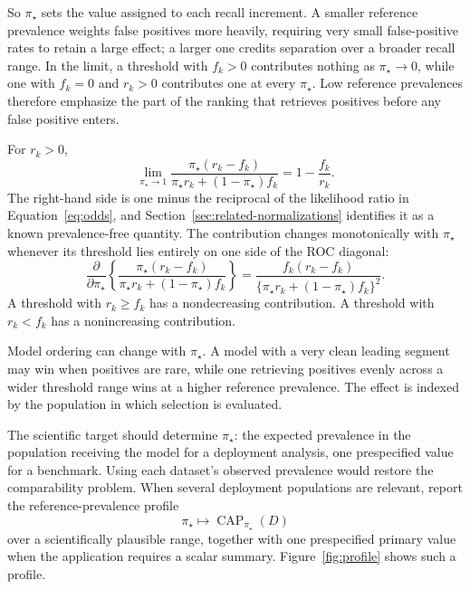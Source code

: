 \documentclass[11pt]{article}
\newcommand{\CAP}{\operatorname{CAP}}
\newcommand{\Tpi}{\CAP_{\pi_\star}}
\theoremstyle{remark}
\begin{document}
So $\pi_\star$ sets the value assigned to each recall increment. A smaller reference prevalence weights false positives more heavily, requiring very small false-positive rates to retain a large effect; a larger one credits separation over a broader recall range. In the limit, a threshold with $f_k>0$ contributes nothing as $\pi_\star\to0$, while one with $f_k=0$ and $r_k>0$ contributes one at every $\pi_\star$. Low reference prevalences therefore emphasize the part of the ranking that retrieves positives before any false positive enters.

For $r_k>0$,
\begin{equation}
\lim_{\pi_\star\to1}
\frac{\pi_\star(r_k-f_k)}
{\pi_\star r_k+(1-\pi_\star)f_k}
=
1-\frac{f_k}{r_k}.
\label{eq:precg-limit}
\end{equation}
The right-hand side is one minus the reciprocal of the likelihood ratio in Equation~\eqref{eq:odds}, and Section~\ref{sec:related-normalizations} identifies it as a known prevalence-free quantity. The contribution changes monotonically with $\pi_\star$ whenever its threshold lies entirely on one side of the ROC diagonal:
\begin{equation}
\frac{\partial}{\partial\pi_\star}
\left\{
\frac{\pi_\star(r_k-f_k)}
{\pi_\star r_k+(1-\pi_\star)f_k}
\right\}
=
\frac{f_k(r_k-f_k)}
{\{\pi_\star r_k+(1-\pi_\star)f_k\}^2}.
\label{eq:reference-prevalence-derivative}
\end{equation}
A threshold with $r_k\geq f_k$ has a nondecreasing contribution. A threshold with $r_k<f_k$ has a nonincreasing contribution.

Model ordering can change with $\pi_\star$. A model with a very clean leading segment may win when positives are rare, while one retrieving positives evenly across a wider threshold range wins at a higher reference prevalence. The effect is indexed by the population in which selection is evaluated.

The scientific target should determine $\pi_\star$: the expected prevalence in the population receiving the model for a deployment analysis, one prespecified value for a benchmark. Using each dataset's observed prevalence would restore the comparability problem. When several deployment populations are relevant, report the reference-prevalence profile
\[
\pi_\star
\longmapsto
\Tpi(D)
\]
over a scientifically plausible range, together with one prespecified primary value when the application requires a scalar summary. Figure~\ref{fig:profile} shows such a profile.
\end{document}
